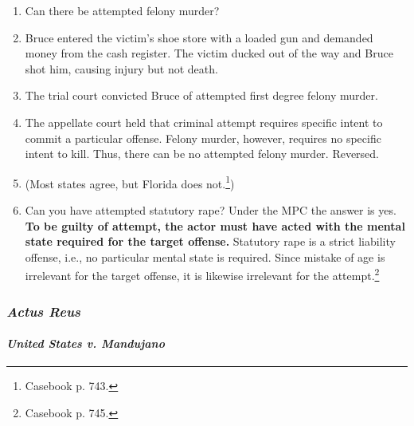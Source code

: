 \begin{enumerate}
    \item Can there be attempted felony murder?
    \item Bruce entered the victim's shoe store with a loaded gun and demanded 
    money from the cash register. The victim ducked out of the way and Bruce 
    shot him, causing injury but not death.
    \item The trial court convicted Bruce of attempted first degree felony 
    murder.
    \item The appellate court held that criminal attempt requires specific 
    intent to commit a particular offense. Felony murder, however, requires no 
    specific intent to kill. Thus, there can be no attempted felony murder.  
    Reversed.
    \item (Most states agree, but Florida does not.\footnote{Casebook p. 
    743.})
    \item Can you have attempted statutory rape? Under the MPC the answer is 
    yes. \textbf{To be guilty of attempt, the actor must have acted with the 
    mental state required for the target offense.} Statutory rape is a strict 
    liability offense, i.e., no particular mental state is required. Since 
    mistake of age is irrelevant for the target offense, it is likewise 
    irrelevant for the attempt.\footnote{Casebook p. 745.}
\end{enumerate}

\subsubsection{\emph{Actus Reus}}

\paragraph{\emph{United States v. Mandujano}}

